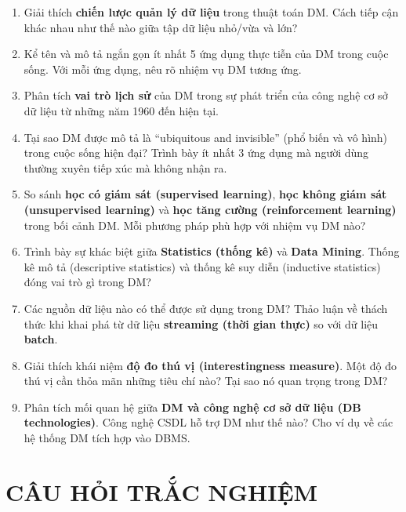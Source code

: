 \documentclass[10pt]{article}
\begin{document}
\begin{enumerate}[leftmargin=*, label=\textbf{Câu \arabic*.}]
    \item Giải thích \textbf{chiến lược quản lý dữ liệu} trong thuật toán DM. Cách tiếp cận khác nhau như thế nào giữa tập dữ liệu nhỏ/vừa và lớn?

    \item Kể tên và mô tả ngắn gọn ít nhất 5 ứng dụng thực tiễn của DM trong cuộc sống. Với mỗi ứng dụng, nêu rõ nhiệm vụ DM tương ứng.

    \item Phân tích \textbf{vai trò lịch sử} của DM trong sự phát triển của công nghệ cơ sở dữ liệu từ những năm 1960 đến hiện tại.

    \item Tại sao DM được mô tả là ``ubiquitous and invisible'' (phổ biến và vô hình) trong cuộc sống hiện đại? Trình bày ít nhất 3 ứng dụng mà người dùng thường xuyên tiếp xúc mà không nhận ra.

    \item So sánh \textbf{học có giám sát (supervised learning)}, \textbf{học không giám sát (unsupervised learning)} và \textbf{học tăng cường (reinforcement learning)} trong bối cảnh DM. Mỗi phương pháp phù hợp với nhiệm vụ DM nào?

    \item Trình bày sự khác biệt giữa \textbf{Statistics (thống kê)} và \textbf{Data Mining}. Thống kê mô tả (descriptive statistics) và thống kê suy diễn (inductive statistics) đóng vai trò gì trong DM?

    \item Các nguồn dữ liệu nào có thể được sử dụng trong DM? Thảo luận về thách thức khi khai phá từ dữ liệu \textbf{streaming (thời gian thực)} so với dữ liệu \textbf{batch}.

    \item Giải thích khái niệm \textbf{độ đo thú vị (interestingness measure)}. Một độ đo thú vị cần thỏa mãn những tiêu chí nào? Tại sao nó quan trọng trong DM?

    \item Phân tích mối quan hệ giữa \textbf{DM và công nghệ cơ sở dữ liệu (DB technologies)}. Công nghệ CSDL hỗ trợ DM như thế nào? Cho ví dụ về các hệ thống DM tích hợp vào DBMS.

\end{enumerate}

\newpage
\section{CÂU HỎI TRẮC NGHIỆM}
\end{document}
